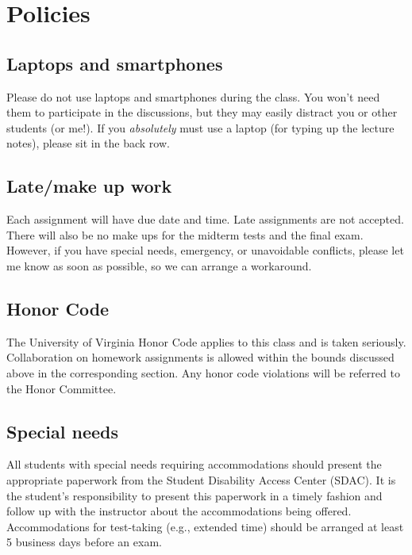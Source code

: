 \documentclass[oneside,11pt]{amsart}
\begin{document}
\section{Policies}

\subsection{Laptops and smartphones}

Please do not use laptops and smartphones during the class.
You won't need them to participate in the discussions, but they may easily distract
you or other students (or me!). If you \emph{absolutely} must use a laptop
(for typing up the lecture notes), please sit in the back row.

\subsection{Late/make up work} Each assignment will have due date and time.
Late assignments are not accepted. There will also be no make ups for the midterm tests and the final exam.
However, if you have special needs, emergency, or unavoidable conflicts, please
let me know as soon as possible, so we can arrange a workaround.

\subsection{Honor Code} The University of Virginia Honor Code applies to this
class and is taken seriously. Collaboration on homework
assignments is allowed within the bounds discussed above
in the corresponding section.
Any honor code violations will be referred to the
Honor Committee.

\subsection{Special needs}

All students with special needs requiring accommodations should present the
appropriate paperwork from the Student Disability Access Center (SDAC). It is
the student's responsibility to present this paperwork in a timely fashion and
follow up with the instructor about the accommodations being offered.
Accommodations for test-taking (e.g., extended time) should be arranged at
least 5 business days before an exam.
\end{document}
